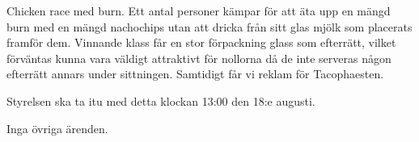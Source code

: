 \documentclass{protokoll}
\begin{document}
Chicken race med burn. Ett antal personer kämpar för att äta upp en mängd burn med en mängd nachochips utan att dricka från sitt glas mjölk som placerats framför dem. Vinnande klass får en stor förpackning glass som efterrätt, vilket förväntas kunna vara väldigt attraktivt för nollorna då de inte serveras någon efterrätt annars under sittningen.
Samtidigt får vi reklam för Tacophaesten.

Styrelsen ska ta itu med detta klockan 13:00 den 18:e augusti.

Inga övriga ärenden.
\end{document}
